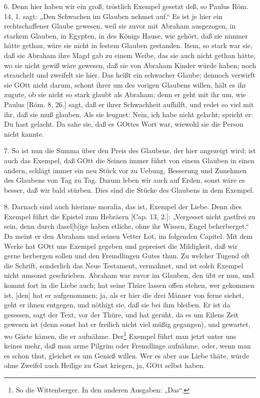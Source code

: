 6. Denn hier haben wir ein groß, tröstlich Exempel gesetzt deß, so Paulus Röm. 14, 1. sagt: „Den Schwachen im Glauben nehmet auf.“ Es ist je hier ein rechtschaffener Glaube gewesen, weil sie zuvor mit Abraham ausgezogen, in starkem Glauben, in Egypten, in des Königs Hause, wie gehört, daß sie nimmer hätte gethan, wäre sie nicht in festem Glauben gestanden. Item, so stark war sie, daß sie Abraham ihre Magd gab zu einem Weibe, das sie auch nicht gethan hätte, wo sie nicht gewiß wäre gewesen, daß sie von Abraham Kinder würde haben; noch strauchelt und zweifelt sie hier. Das heißt ein schwacher Glaube; dennoch verwirft sie GOtt nicht darum, schont ihrer um des vorigen Glaubens willen, hält es ihr zugute, ob sie nicht so stark glaubt als Abraham; denn er geht mit ihr um, wie Paulus [Röm. 8, 26.] sagt, daß er ihrer Schwachheit aufhilft, und redet so viel mit ihr, daß sie muß glauben. Als sie leugnet: Nein, ich habe nicht gelacht; spricht er: Du hast gelacht. Da sahe sie, daß es GOttes Wort war, wiewohl sie die Person nicht kannte.

7. So ist nun die Summa über den Preis des Glaubens, der hier angezeigt wird; ist auch das Exempel, daß GOtt die Seinen immer führt von einem Glauben in einen andern, schlägt immer ein neu Stück vor zu Uebung, Besserung und Zunehmen des Glaubens von Tag zu Tag. Darum leben wir auch auf Erden, sonst wäre es besser, daß wir bald stürben. Dies sind die Stücke des Glaubens in dem Exempel.

8. Darnach sind auch hierinne moralia, das ist, Exempel der Liebe. Denn dies Exempel führt die Epistel zum Hebräern [Cap. 13, 2.]: „Vergesset nicht gastfrei zu sein, denn durch dasel[b]ige haben etliche, ohne ihr Wissen, Engel beherberget.“ Da meint er den Abraham und seinen Vetter Lot, im folgenden Capitel. Mit dem Werke hat GOtt uns Exempel gegeben und gepreiset die Mildigkeit, daß wir gerne herbergen sollen und den Fremdlingen Gutes thun. Zu welcher Tugend oft die Schrift, sonderlich das Neue Testament, vermahnet, und ist solch Exempel nicht umsonst geschrieben. Abraham war zuvor im Glauben, den übt er nun, und kommt fort in die Liebe auch; hat seine Thüre lassen offen stehen, wer gekommen ist, [den] hat er aufgenommen; ja, als er hier die drei Männer von ferne siehet, geht er ihnen entgegen, und nöthigt sie, daß sie bei ihm bleiben. Er ist da gesessen, sagt der Text, vor der Thüre, und hat geruht, da es um Eilens Zeit gewesen ist (denn sonst hat er freilich nicht viel müßig gegangen), und gewartet, wo Gäste kämen, die er aufnähme. Der\footnote{So die Wittenberger. In den anderen Ausgaben: „Das“.} Exempel führt man jetzt unter uns keines mehr, daß man arme Pilgrim oder Fremdlinge aufnähme, oder, wenn man es schon thut, gleichet es um Genieß willen. Wer es aber aus Liebe thäte, würde ohne Zweifel auch Heilige zu Gast kriegen, ja, GOtt selbst haben.

